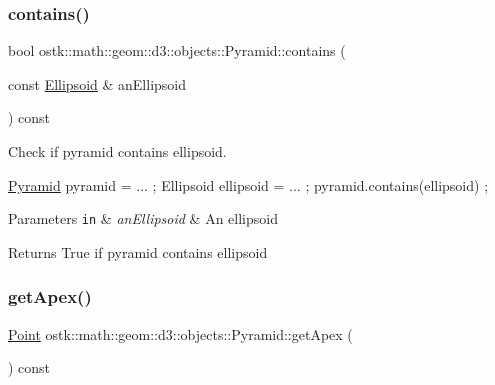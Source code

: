 \subsubsection{\texorpdfstring{contains()}{contains()}\hspace{0.1cm}{\footnotesize\ttfamily [2/2]}}
{\footnotesize\ttfamily bool ostk\+::math\+::geom\+::d3\+::objects\+::\+Pyramid\+::contains (\begin{DoxyParamCaption}\item[{const \hyperlink{classostk_1_1math_1_1geom_1_1d3_1_1objects_1_1_ellipsoid}{Ellipsoid} \&}]{an\+Ellipsoid }\end{DoxyParamCaption}) const}



Check if pyramid contains ellipsoid. 


\begin{DoxyCode}
\hyperlink{classostk_1_1math_1_1geom_1_1d3_1_1objects_1_1_pyramid_a5560d123994714b36d4737b358dadcea}{Pyramid} pyramid = ... ;
Ellipsoid ellipsoid = ... ;
pyramid.contains(ellipsoid) ;
\end{DoxyCode}



\begin{DoxyParams}[1]{Parameters}
\mbox{\tt in}  & {\em an\+Ellipsoid} & An ellipsoid \\
\hline
\end{DoxyParams}
\begin{DoxyReturn}{Returns}
True if pyramid contains ellipsoid 
\end{DoxyReturn}
\mbox{\label{classostk_1_1math_1_1geom_1_1d3_1_1objects_1_1_pyramid_acbc557f7d8bbfe1fc3f59fdad16684a3}} 
\subsubsection{\texorpdfstring{get\+Apex()}{getApex()}}
{\footnotesize\ttfamily \hyperlink{classostk_1_1math_1_1geom_1_1d3_1_1objects_1_1_point}{Point} ostk\+::math\+::geom\+::d3\+::objects\+::\+Pyramid\+::get\+Apex (\begin{DoxyParamCaption}{ }\end{DoxyParamCaption}) const}



